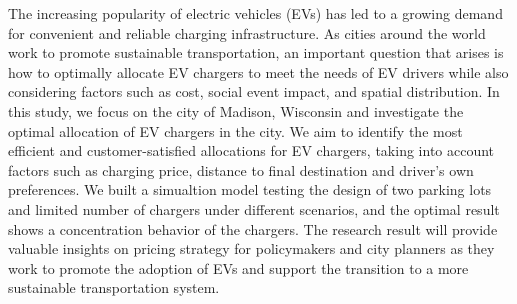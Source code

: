 The increasing popularity of electric vehicles (EVs) has led to a growing demand for convenient and reliable charging infrastructure. As cities around the world work to promote sustainable transportation, an important question that arises is how to optimally allocate EV chargers to meet the needs of EV drivers while also considering factors such as cost, social event impact, and spatial distribution. In this study, we focus on the city of Madison, Wisconsin and investigate the optimal allocation of EV chargers in the city. We aim to identify the most efficient and customer-satisfied allocations for EV chargers, taking into account factors such as charging price, distance to final destination and driver's own preferences. We built a simualtion model testing the design of two parking lots and limited number of chargers under different scenarios, and the optimal result shows a concentration behavior of the chargers. The research result will provide valuable insights on pricing strategy for policymakers and city planners as they work to promote the adoption of EVs and support the transition to a more sustainable transportation system.
